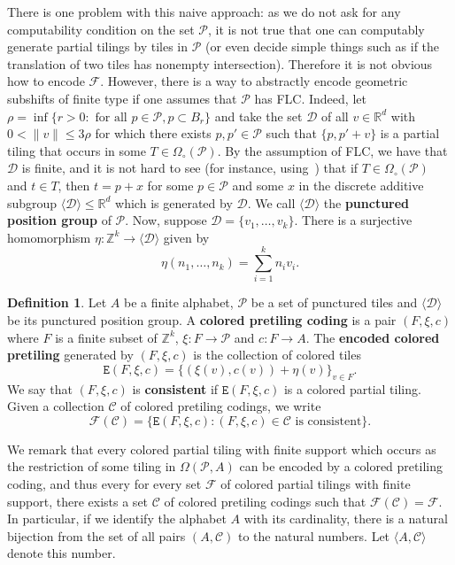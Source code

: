 \documentclass{article}
\theoremstyle{definition}
\newtheorem{defn}[theorem]{Definition} %
\theoremstyle{definition}
\newcommand{\ZZ}{\mathbb{Z}}
\newcommand{\RR}{\mathbb{R}}
\newcommand{\PP}{\mathcal{P}}
\newcommand{\FF}{\mathcal{F}}
\newcommand{\norm}[1]{\|{#1}\|}
\newcommand{\define}[1]{\textbf{#1}}
\begin{document}
There is one problem with this naive approach: as we do not ask for any computability condition on the set $\PP$, it is not true that one can computably generate partial tilings by tiles in $\PP$ (or even decide simple things such as if the translation of two tiles has nonempty intersection). Therefore it is not obvious how to encode $\FF$. However, there is a way to abstractly encode geometric subshifts of finite type if one assumes that $\PP$ has FLC. Indeed, let $\rho = \inf\{ r >0 : \mbox{ for all } p \in \PP, p \subset B_r\}$ and take the set $\mathcal{D}$ of all $v \in \RR^d$ with $0 < \norm{v}\leq 3\rho$ for which there exists $p,p' \in \PP$ such that $\{p, p'+v\}$ is a partial tiling that occurs in some $T\in \Omega_{\circ}(\PP)$. By the assumption of FLC, we have that $\mathcal{D}$ is finite, and it is not hard to see (for instance, using~) that if $T\in \Omega_{\circ}(\PP)$ and $t\in T$, then $t = p+x$ for some $p \in \PP$ and some $x$ in the discrete additive subgroup $\langle \mathcal{D}\rangle \leqslant \RR^d$ which is generated by $\mathcal{D}$. We call $\langle \mathcal{D}\rangle $ the \define{punctured position group} of $\PP$.
Now, suppose $\mathcal{D}= \{v_1,\dots,v_k\}$. There is a surjective homomorphism $\eta \colon \ZZ^k \to \langle \mathcal{D}\rangle$ given by \[ \eta(n_1,\dots,n_k) = \sum_{i=1}^k n_iv_i. \]

\begin{defn}
    Let $A$ be a finite alphabet, $\PP$ be a set of punctured tiles and $\langle \mathcal{D}\rangle$ be its punctured position group. A \define{colored pretiling coding} is a pair $(F,\xi,c)$ where $F$ is a finite subset of $\ZZ^k$, $\xi \colon F \to \PP$ and $c\colon F \to A$. The \define{encoded colored pretiling} generated by $(F,\xi,c)$ is the collection of colored tiles \[\mathtt{E}(F,\xi,c) = \{ (\xi(v),c(v)) + \eta(v) \}_{v \in F}.     \]
    We say that $(F,\xi,c)$ is \define{consistent} if $\mathtt{E}(F,\xi,c)$ is a colored partial tiling. Given a collection $\mathcal{C}$ of colored pretiling codings, we write \[\mathcal{F}(\mathcal{C}) = \{ \mathtt{E}(F,\xi,c) : (F,\xi,c) \in \mathcal{C} \mbox{ is consistent} \}.   \]
\end{defn}

We remark that every colored partial tiling with finite support which occurs as the restriction of some tiling in $\Omega(\PP,A)$ can be encoded by a colored pretiling coding, and thus every for every set $\FF$ of colored partial tilings with finite support, there exists a set $\mathcal{C}$ of colored pretiling codings such that $\FF(\mathcal{C})=\FF$. In particular, if we identify the alphabet $A$ with its cardinality, there is a natural bijection from the set of all pairs $(A,\mathcal{C})$ to the natural numbers. Let $\langle A,\mathcal{C}\rangle$ denote this number.
\end{document}

